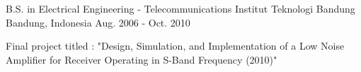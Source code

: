 

\begin{cventries}

  \cventry
    {B.S. in Electrical Engineering - Telecommunications} %
    {Institut Teknologi Bandung} %
    {Bandung, Indonesia} %
    {Aug. 2006 - Oct. 2010} %
    {
      \begin{cvitems} %
        \item {Final project titled : "Design, Simulation, and Implementation of a Low Noise Amplifier for Receiver Operating in S-Band Frequency (2010)"}
      \end{cvitems}
    }

\end{cventries}
